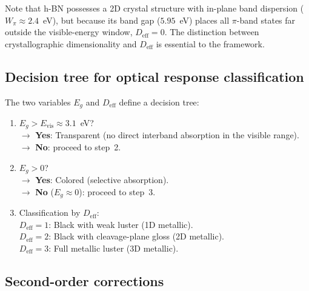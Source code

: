 \documentclass[twocolumn,showpacs,preprintnumbers,amsmath,amssymb,prb]{revtex4-2}
\begin{document}
Note that h-BN possesses a 2D crystal structure with in-plane band
dispersion ($W_\pi \approx 2.4$~eV), but because its band gap
($5.95$~eV) places all $\pi$-band states far outside the visible-energy
window, $D_\mathrm{eff} = 0$. The distinction between crystallographic
dimensionality and $D_\mathrm{eff}$ is essential to the framework.

\subsection{Decision tree for optical response classification}
\label{sec:tree}

The two variables $E_g$ and $D_\mathrm{eff}$ define a decision tree:

\begin{enumerate}
  \item $E_g > E_\mathrm{vis} \approx 3.1$~eV? \\
    $\to$ \textbf{Yes}: Transparent (no direct interband absorption in
    the visible range). \\
    $\to$ \textbf{No}: proceed to step~2.
  \item $E_g > 0$? \\
    $\to$ \textbf{Yes}: Colored (selective absorption). \\
    $\to$ \textbf{No} ($E_g \approx 0$): proceed to step~3.
  \item Classification by $D_\mathrm{eff}$: \\
    $D_\mathrm{eff} = 1$: Black with weak luster (1D metallic). \\
    $D_\mathrm{eff} = 2$: Black with cleavage-plane gloss (2D metallic). \\
    $D_\mathrm{eff} = 3$: Full metallic luster (3D metallic).
\end{enumerate}

\subsection{Second-order corrections}
\end{document}
